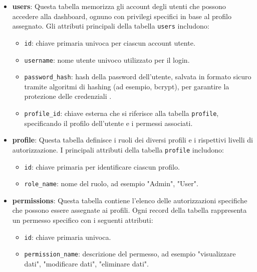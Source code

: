 \begin{itemize}
    \item \textbf{users}: Questa tabella memorizza gli account degli utenti che possono accedere alla dashboard, ognuno con privilegi specifici in base al profilo assegnato. Gli attributi principali della tabella \texttt{users} includono:
        \begin{itemize}
            \item \texttt{id}: chiave primaria univoca per ciascun account utente.
            \item \texttt{username}: nome utente univoco utilizzato per il login.
            \item \texttt{password\_hash}: hash della password dell’utente, salvata in formato sicuro tramite algoritmi di hashing (ad esempio, bcrypt), per garantire la protezione delle credenziali \cite{menezes1996handbook}.
            \item \texttt{profile\_id}: chiave esterna che si riferisce alla tabella \texttt{profile}, specificando il profilo dell’utente e i permessi associati.
        \end{itemize}


    \item \textbf{profile}: Questa tabella definisce i ruoli dei diversi profili e i rispettivi livelli di autorizzazione. I principali attributi della tabella \texttt{profile} includono:
        \begin{itemize}
            \item \texttt{id}: chiave primaria per identificare ciascun profilo.
            \item \texttt{role\_name}: nome del ruolo, ad esempio "Admin", "User".
        \end{itemize}

    \item \textbf{permissions}: Questa tabella contiene l’elenco delle autorizzazioni specifiche che possono essere assegnate ai profili. Ogni record della tabella rappresenta un permesso specifico con i seguenti attributi:
        \begin{itemize}
            \item \texttt{id}: chiave primaria univoca.
            \item \texttt{permission\_name}: descrizione del permesso, ad esempio "visualizzare dati", "modificare dati", "eliminare dati".
        \end{itemize}


\end{itemize}
